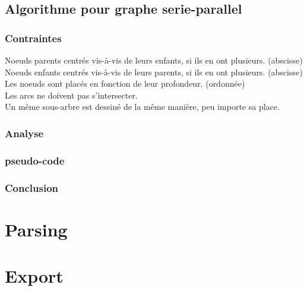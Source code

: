 \documentclass[11pt]{report}
\begin{document}
\subsection{Algorithme pour graphe serie-parallel}
\subsubsection{Contraintes}
Noeuds parents centrés vis-à-vis de leurs enfants, si ils en ont plusieurs. (abscisse)\\
Noeuds enfants centrés vis-à-vis de leurs parents, si ils en ont plusieurs. (abscisse)\\
Les noeuds sont placés en fonction de leur profondeur.                      (ordonnée)\\
Les arcs ne doivent pas s'intersecter.\\
Un même sous-arbre est dessiné de la même manière, peu importe sa place.\\

\subsubsection{Analyse}

\subsubsection{pseudo-code}
\subsubsection{Conclusion}

\section{Parsing}

\section{Export}
\end{document}
